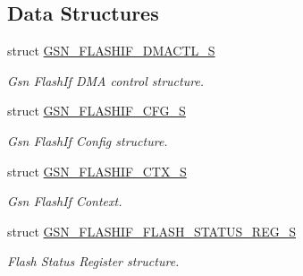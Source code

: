 \subsection*{Data Structures}
\begin{DoxyCompactItemize}
\item 
struct \hyperlink{a00080}{GSN\_\-FLASHIF\_\-DMACTL\_\-S}
\begin{DoxyCompactList}\small\item\em Gsn FlashIf DMA control structure. \end{DoxyCompactList}\item 
struct \hyperlink{a00078}{GSN\_\-FLASHIF\_\-CFG\_\-S}
\begin{DoxyCompactList}\small\item\em Gsn FlashIf Config structure. \end{DoxyCompactList}\item 
struct \hyperlink{a00079}{GSN\_\-FLASHIF\_\-CTX\_\-S}
\begin{DoxyCompactList}\small\item\em Gsn FlashIf Context. \end{DoxyCompactList}\item 
struct \hyperlink{a00081}{GSN\_\-FLASHIF\_\-FLASH\_\-STATUS\_\-REG\_\-S}
\begin{DoxyCompactList}\small\item\em Flash Status Register structure. \end{DoxyCompactList}\end{DoxyCompactItemize}

